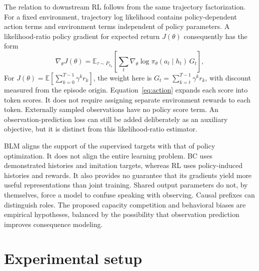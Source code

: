 \documentclass{article} %
\begin{document}
The relation to downstream RL follows from the same trajectory factorization. For a fixed environment, trajectory log likelihood contains policy-dependent action terms and environment terms independent of policy parameters. A likelihood-ratio policy gradient for expected return $J(\theta)$ consequently has the form
\begin{equation}
 \nabla_\theta J(\theta)
 =\mathbb E_{\tau\sim P_{\pi_\theta}}\left[
 \sum_t\nabla_\theta\log\pi_\theta(a_t\mid h_t)\,G_t\right],
 \label{eq:pg}
\end{equation}
For $J(\theta)=\mathbb E[\sum_{k=0}^{T-1}\gamma^k r_k]$, the weight here is $G_t=\sum_{k=t}^{T-1}\gamma^k r_k$, with discount measured from the episode origin. Equation~\ref{eq:action} expands each score into token scores. It does not require assigning separate environment rewards to each token. Externally sampled observations have no policy score term. An observation-prediction loss can still be added deliberately as an auxiliary objective, but it is distinct from this likelihood-ratio estimator.

BLM aligns the support of the supervised targets with that of policy optimization. It does not align the entire learning problem. BC uses demonstrated histories and imitation targets, whereas RL uses policy-induced histories and rewards. It also provides no guarantee that its gradients yield more useful representations than joint training. Shared output parameters do not, by themselves, force a model to confuse speaking with observing. Causal prefixes can distinguish roles. The proposed capacity competition and behavioral biases are empirical hypotheses, balanced by the possibility that observation prediction improves consequence modeling.

\section{Experimental setup}
\label{sec:experiments}
\end{document}
